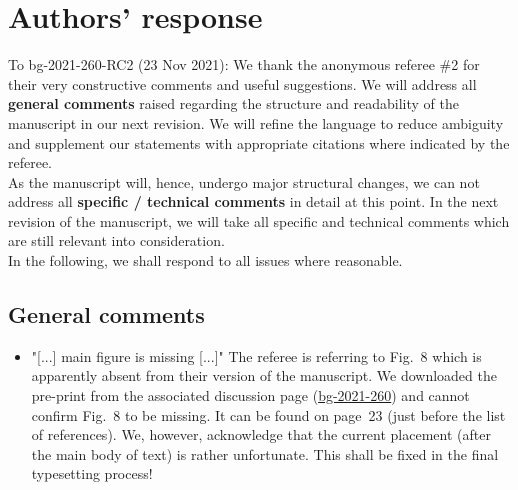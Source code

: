 \documentclass{scrartcl}
\begin{document}
\section*{Authors' response}
To bg-2021-260-RC2 (23 Nov 2021):
We thank the anonymous referee \#2 for their very constructive comments and useful suggestions.
We will address all \textbf{general comments} raised regarding the structure and readability of the manuscript in our next revision. We will refine the language to reduce ambiguity and supplement our statements with appropriate citations where indicated by the referee.\\
As the manuscript will, hence, undergo major structural changes, we can not address all \textbf{specific / technical comments} in detail at this point. In the next revision of the manuscript, we will take all specific and technical comments which are still relevant into consideration.\\
In the following, we shall respond to all issues where reasonable.

\subsection*{General comments}
\begin{itemize}
    
    \item {\color{blue} "[...] main figure is missing [...]"} The referee is referring to Fig.~8 which is apparently absent from their version of the manuscript. We downloaded the pre-print from the associated discussion page (\href{https://bg.copernicus.org/preprints/bg-2021-260/}{bg-2021-260}) and cannot confirm Fig.~8 to be missing. It can be found on page~23 (just before the list of references). We, however, acknowledge that the current placement (after the main body of text) is rather unfortunate. This shall be fixed in the final typesetting process!

\end{itemize}
\end{document}

